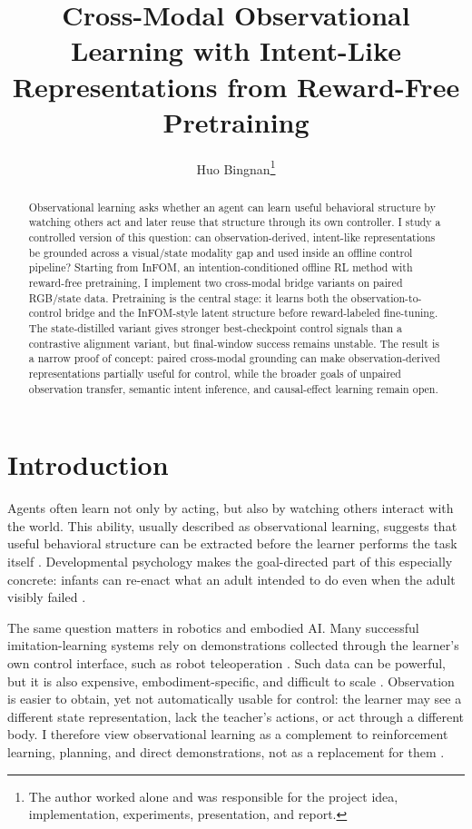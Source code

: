 \documentclass{article}
\title{Cross-Modal Observational Learning with Intent-Like Representations from Reward-Free Pretraining}
\author{Huo Bingnan\thanks{The author worked alone and was responsible for the project idea, implementation, experiments, presentation, and report.}}
\date{}
\begin{document}
\maketitle

\begin{abstract}
Observational learning asks whether an agent can learn useful behavioral structure by watching others act and later reuse that structure through its own controller. I study a controlled version of this question: can observation-derived, intent-like representations be grounded across a visual/state modality gap and used inside an offline control pipeline? Starting from InFOM, an intention-conditioned offline RL method with reward-free pretraining, I implement two cross-modal bridge variants on paired RGB/state data. Pretraining is the central stage: it learns both the observation-to-control bridge and the InFOM-style latent structure before reward-labeled fine-tuning. The state-distilled variant gives stronger best-checkpoint control signals than a contrastive alignment variant, but final-window success remains unstable. The result is a narrow proof of concept: paired cross-modal grounding can make observation-derived representations partially useful for control, while the broader goals of unpaired observation transfer, semantic intent inference, and causal-effect learning remain open.
\end{abstract}

\section{Introduction}

Agents often learn not only by acting, but also by watching others interact with the world. This ability, usually described as observational learning, suggests that useful behavioral structure can be extracted before the learner performs the task itself \citep{Bandura1977}. Developmental psychology makes the goal-directed part of this especially concrete: infants can re-enact what an adult intended to do even when the adult visibly failed \citep{Meltzoff1995}.

The same question matters in robotics and embodied AI. Many successful imitation-learning systems rely on demonstrations collected through the learner's own control interface, such as robot teleoperation \citep{Osa2018,Fu2024MobileALOHA}. Such data can be powerful, but it is also expensive, embodiment-specific, and difficult to scale \citep{Fu2024MobileALOHA}. Observation is easier to obtain, yet not automatically usable for control: the learner may see a different state representation, lack the teacher's actions, or act through a different body. I therefore view observational learning as a complement to reinforcement learning, planning, and direct demonstrations, not as a replacement for them \citep{Borsa2019,Chang2024ILfO}.
\end{document}
